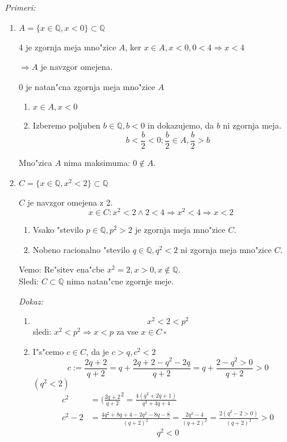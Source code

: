 \emph{Primeri:}
\begin{enumerate}
	\item $A = \{x \in \mathbb{Q}, x < 0\} \subset \mathbb{Q}$
	
	4 je zgornja meja mno"zice $A$, ker $x \in A, x < 0, 0 < 4 \Rightarrow x < 4$
	
	$\Rightarrow A$ je navzgor omejena.
	
	0 je natan"cna zgornja meja mno"zice $A$
	\begin{enumerate}
		\item $x \in A, x < 0$
		\item  Izberemo poljuben $b \in \mathbb{Q}, b < 0$ in dokazujemo, da $b$ ni zgornja meja.
		\[b < \frac{b}{2} < 0; \frac{b}{2} \in A, \frac{b}{2} > b \]
	\end{enumerate}
	Mno"zica $A$ nima maksimuma: $0 \notin A$.
	
	\item $C = \{x \in \mathbb{Q}, x^2 < 2\} \subset \mathbb{Q}$
	
	$C$ je navzgor omejena z 2.
	\[x \in C: x^2 < 2 \land 2 < 4 \Rightarrow x^2 < 4 \Rightarrow x < 2 \]
	\begin{enumerate}
		\item Vsako "stevilo $p \in \mathbb{Q}, p^2 > 2$ je zgornja meja mno"zice $C$.
		\item Nobeno racionalno "stevilo $q \in \mathbb{Q}, q^2 < 2$ ni zgornja meja mno"zice $C$.
	\end{enumerate}

	Vemo: Re"sitev ena"cbe $x^2 = 2, x > 0, x \notin \mathbb{Q}$.\\
	Sledi: $C \subset \mathbb{Q}$ nima natan"cne zgornje meje.
	
	\emph{Dokaz:}
	\begin{enumerate}
		\item \[x^2 < 2 < p^2\]
		sledi: $x^2 < p^2 \Rightarrow x < p$ za vse $x \in C\ \square$
		
		\item I"s"cemo $c \in C$, da je $c > q, c^2 < 2$
		\[c := \frac{2q + 2}{q + 2} = q + \frac{2q + 2 - q^2 - 2q}{q+2} = q + \frac{2 - q^2 > 0}{q + 2} > 0\]
		$(q^2 < 2)$
		\begin{align*}
			c^2 &= (\frac{2q + 2}{q + 2}^2 = \frac{4(q^2 + 2q + 1)}{q^2 + 4q + 4}\\
			c^2 - 2 &=\frac{4q^2 + 8q + 4 - 2q^2 - 8q - 8}{(q + 2)^2} = \frac{2q^2 - 4}{(q+2)^2} = \frac{2(q^2 - 2 > 0)}{(q+2)^2} > 0
		\end{align*}
		\[q^2 < 0\]
	\end{enumerate}
\end{enumerate}